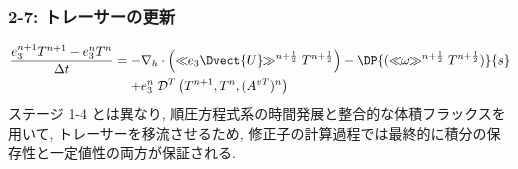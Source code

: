 \subsubsection*{2-7: トレーサーの更新} 
\vspace{-1.2cm}
\begin{align*}
 \dfrac{e_3^{n+1}T^{n+1} - e_3^n T^n}{\Delta t}
 = 
   -& \nabla_h \cdot 
    \left( \ll\!\!e_3 \Dvect{U}\!\!\gg^{n+\frac{1}{2}}
                        T^{n+\frac{1}{2}} \right) 
   - \DP{(\ll\!\!\omega\!\!\gg^{n+\frac{1}{2}} T^{n+\frac{1}{2}})}{s}
   \nonumber \\
   +&  e_3^n \; \mathcal{D}^{T} \left(T^{n+1},T^n, (A^{vT})^n \right)
\end{align*}
ステージ 1-4 とは異なり, 順圧方程式系の時間発展と整合的な体積フラックスを用いて,  
トレーサーを移流させるため, 修正子の計算過程では最終的に積分の保存性と一定値性の両方が保証される. 
